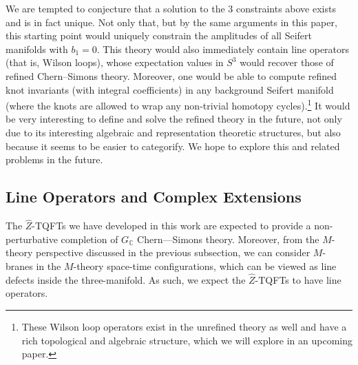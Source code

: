 \documentclass{article}
\newcommand{\C}{{\mathbb C}}
\numberwithin{corollary}{theorem}
\numberwithin{corollary}{proposition}
\begin{document}
We are tempted to conjecture that a solution to the 3 constraints above exists and is in fact unique. Not only that, but by the same arguments in this paper, this starting point would uniquely constrain the amplitudes of all Seifert manifolds with $b_1 =0$. This theory would also immediately contain line operators (that is, Wilson loops), whose expectation values in $S^3$ would recover those of refined Chern--Simons theory. Moreover, one would be able to compute refined knot invariants (with integral coefficients) in any background Seifert manifold (where the knots are allowed to wrap any non-trivial homotopy cycles).\footnote{ These Wilson loop operators exist in the unrefined theory as well and have a rich topological and algebraic structure, which we will explore in an upcoming paper.} It would be very interesting to define and solve the refined theory in the future, not only due to its interesting algebraic and representation theoretic structures, but also because it seems to be easier to categorify. We hope to explore this and related problems in the future. 







\subsection{Line Operators and Complex Extensions}
The $\hat{Z}$-TQFTs we have developed in this work are expected to provide a non-perturbative completion of $G_{\C}$ Chern—Simons theory. Moreover, from the $M$-theory perspective discussed in the previous subsection, we can consider $M$-branes in the $M$-theory space-time configurations, which can be viewed as line defects inside the three-manifold. As such, we expect the $\hat{Z}$-TQFTs to have line operators. 
\end{document}
